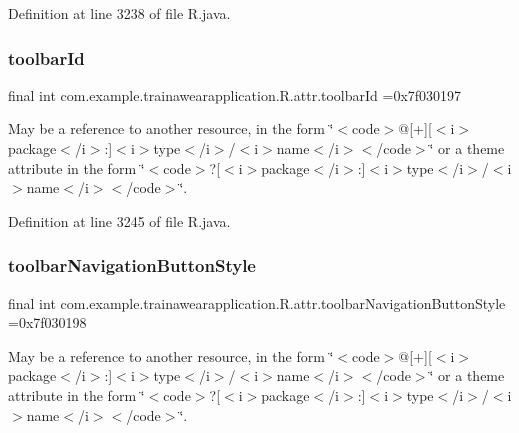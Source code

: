 Definition at line 3238 of file R.\+java.

\mbox{\label{classcom_1_1example_1_1trainawearapplication_1_1_r_1_1attr_aa3b30bdbaa8dc8cc6512a4edbf6bbce7}} 
\subsubsection{\texorpdfstring{toolbarId}{toolbarId}}
{\footnotesize\ttfamily final int com.\+example.\+trainawearapplication.\+R.\+attr.\+toolbar\+Id =0x7f030197\hspace{0.3cm}{\ttfamily [static]}}

May be a reference to another resource, in the form \char`\"{}$<$code$>$@\mbox{[}+\mbox{]}\mbox{[}$<$i$>$package$<$/i$>$\+:\mbox{]}$<$i$>$type$<$/i$>$/$<$i$>$name$<$/i$>$$<$/code$>$\char`\"{} or a theme attribute in the form \char`\"{}$<$code$>$?\mbox{[}$<$i$>$package$<$/i$>$\+:\mbox{]}$<$i$>$type$<$/i$>$/$<$i$>$name$<$/i$>$$<$/code$>$\char`\"{}. 

Definition at line 3245 of file R.\+java.

\mbox{\label{classcom_1_1example_1_1trainawearapplication_1_1_r_1_1attr_a1b2dab30a135801184ef61ca625e597f}} 
\subsubsection{\texorpdfstring{toolbarNavigationButtonStyle}{toolbarNavigationButtonStyle}}
{\footnotesize\ttfamily final int com.\+example.\+trainawearapplication.\+R.\+attr.\+toolbar\+Navigation\+Button\+Style =0x7f030198\hspace{0.3cm}{\ttfamily [static]}}

May be a reference to another resource, in the form \char`\"{}$<$code$>$@\mbox{[}+\mbox{]}\mbox{[}$<$i$>$package$<$/i$>$\+:\mbox{]}$<$i$>$type$<$/i$>$/$<$i$>$name$<$/i$>$$<$/code$>$\char`\"{} or a theme attribute in the form \char`\"{}$<$code$>$?\mbox{[}$<$i$>$package$<$/i$>$\+:\mbox{]}$<$i$>$type$<$/i$>$/$<$i$>$name$<$/i$>$$<$/code$>$\char`\"{}. 

